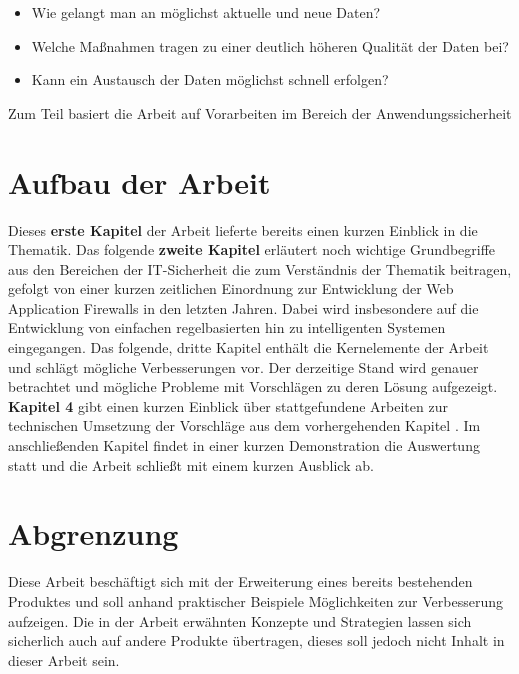 \begin{itemize}
\item Wie gelangt man an möglichst aktuelle und neue Daten?
\item Welche Maßnahmen tragen zu einer deutlich höheren Qualität der Daten bei?
\item Kann ein Austausch der Daten möglichst schnell erfolgen?
\end{itemize}


Zum Teil basiert die Arbeit auf Vorarbeiten im Bereich der Anwendungssicherheit 


\section{Aufbau der Arbeit}


Dieses \textbf{erste Kapitel} der Arbeit lieferte bereits einen kurzen Einblick in die Thematik. Das folgende \textbf{zweite Kapitel} erläutert noch wichtige Grundbegriffe aus den Bereichen der IT-Sicherheit die zum Verständnis der Thematik beitragen, gefolgt von einer kurzen zeitlichen Einordnung zur Entwicklung der Web Application Firewalls in den letzten Jahren. Dabei wird insbesondere auf die Entwicklung von einfachen regelbasierten hin zu intelligenten Systemen eingegangen. Das folgende, dritte Kapitel enthält die Kernelemente der Arbeit und schlägt mögliche Verbesserungen vor. Der derzeitige Stand wird genauer betrachtet und mögliche Probleme mit Vorschlägen zu deren Lösung aufgezeigt. \textbf{Kapitel 4} gibt einen kurzen Einblick über stattgefundene Arbeiten zur technischen Umsetzung der Vorschläge aus dem vorhergehenden Kapitel . Im anschließenden Kapitel findet in einer kurzen Demonstration die Auswertung statt und die Arbeit schließt mit einem kurzen Ausblick ab.

\section{Abgrenzung}

Diese Arbeit beschäftigt sich mit der Erweiterung eines bereits bestehenden Produktes und soll anhand praktischer Beispiele Möglichkeiten zur Verbesserung aufzeigen. Die in der Arbeit erwähnten Konzepte und Strategien lassen sich sicherlich auch auf andere Produkte übertragen, dieses soll jedoch nicht Inhalt in dieser Arbeit sein.
